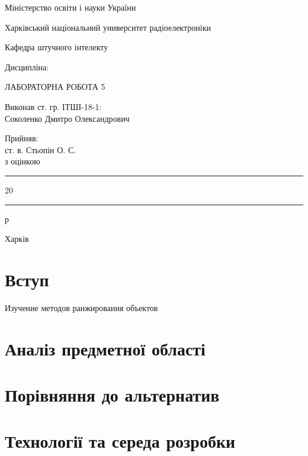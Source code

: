 \documentclass[a4paper,14pt]{extarticle}
\begin{document}
\begin{titlepage}
	\centering
    Міністерство освіти і науки України
    
    Харківський національний университет радіоелектроніки

    \vspace{1cm}
    Кафедра штучного інтелекту

    \vspace{2cm}
    Дисципліна: 

    \vspace{2cm}
    \uppercase{Лабораторна робота 5}

    
    \uppercase{}

    \vspace{4cm}
    \begin{minipage}[t]{10cm}
        Виконав ст. гр. ІТШІ-18-1:\\
        Соколенко Дмитро Олександрович
    \end{minipage}
    \hfill
    \begin{minipage}[t]{6cm}
        Прийняв:\\
        ст. в. Стьопін О. С.\\
        з оцінкою \say{\rule{2cm}{0.15mm}}\\
        \say{\rule{0.7cm}{0.15mm}}\rule{2cm}{0.15mm}20\rule{0.7cm}{0.15mm}р
    \end{minipage}

	\vfill

	{Харків \the\year{}}
\end{titlepage}
\section*{Вступ}
Изучение методов ранжирования объектов

\section{Аналіз предметної області}

\section{Порівняння до альтернатив}

\section{Технології та середа розробки}
\end{document}
